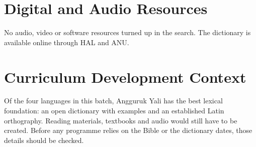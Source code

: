 \documentclass[12pt]{article}
\begin{document}
\section{Digital and Audio Resources}
No audio, video or software resources turned up in the search. The dictionary is available online through HAL and ANU.

\section{Curriculum Development Context}
Of the four languages in this batch, Angguruk Yali has the best lexical foundation: an open dictionary with examples and an established Latin orthography. Reading materials, textbooks and audio would still have to be created. Before any programme relies on the Bible or the dictionary dates, those details should be checked.
\end{document}
